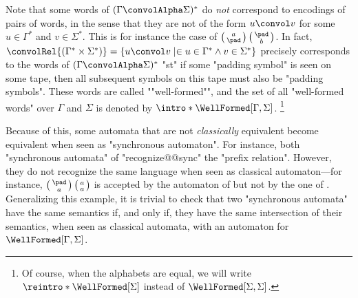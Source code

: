\begin{remark}
	Note that some words of $(\Gamma\convolAlpha \Sigma)^*$ do \emph{not} correspond to
	encodings of pairs of words, in the sense that they are not of the
	form $u \convol v$ for some $u \in \Gamma^*$ and $v\in \Sigma^*$. 
	This is for instance the case of $\pair{a}{\pad}\pair{\pad}{b}$.
	In fact, $\convolRel{(\Gamma^*\times\Sigma^*)} =
	\{u \convol v \mid \in u \in \Gamma^* \land v\in \Sigma^* \}$ precisely corresponds to
	the words of $(\Gamma\convolAlpha \Sigma)^*$ "st" if some "padding symbol" is seen
	on some tape, then all subsequent symbols on this tape must also be "padding symbols".
	These words are called \AP""well-formed"", and the set of all "well-formed words" over
	$\Gamma$ and $\Sigma$ is denoted by \AP$\intro*\WellFormed[\Gamma,\Sigma]$.%
	\footnote{Of course, when the alphabets are equal, we will write
	$\reintro*\WellFormed[\Sigma]$ instead of $\WellFormed[\Sigma,\Sigma]$.}
\end{remark}

Because of this, some automata that are not \emph{classically} equivalent
become equivalent when seen as "synchronous automaton". For instance, 
both "synchronous automata" of
"recognize@@sync" the "prefix relation". However, they do not recognize
the same language when seen as classical automaton---for instance, $\pair{\pad}{a}\pair{a}{a}$
is accepted by the automaton of 
but not by the one of .
Generalizing this example, it is trivial to check that two "synchronous automata"
have the same semantics if, and only if, they have the same
intersection of their semantics, when seen as classical automata, with
an automaton for $\WellFormed[\Gamma,\Sigma]$.

